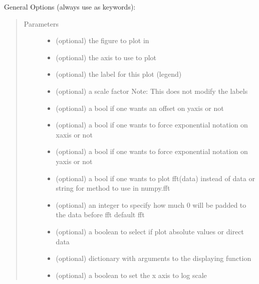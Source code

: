 \documentclass[letterpaper,10pt,openany,oneside,english]{sphinxmanual}
\begin{document}
\begin{fulllineitems}
\begin{fulllineitems}
General Options (always use as keywords):
\begin{quote}\begin{description}
\item[{Parameters}] \leavevmode\begin{itemize}
\item {} 
 \textendash{} (optional) the figure to plot in

\item {} 
 \textendash{} (optional) the axis to use to plot

\item {} 
 \textendash{} (optional) the label for this plot (legend)

\item {} 
 \textendash{} (optional) a scale factor Note: This does not modify the labels

\item {} 
 \textendash{} (optional) a bool if one wants an offset on yaxis or not

\item {} 
 \textendash{} (optional) a bool if one wants to force exponential notation on xaxis or not

\item {} 
 \textendash{} (optional) a bool if one wants to force exponential notation on yaxis or not

\item {} 
 \textendash{} (optional) a bool if one wants to plot fft(data) instead of data or string for method to use in numpy.fft

\item {} 
 \textendash{} (optional) an integer to specify how much 0 will be padded to the data before fft default fft

\item {} 
 \textendash{} (optional) a boolean to select if plot absolute values or direct data

\item {} 
 \textendash{} (optional) dictionary with arguments to the displaying function

\item {} 
 \textendash{} (optional) a boolean to set the x axis to log scale


\end{itemize}
\end{description}
\end{quote}
\end{fulllineitems}
\end{fulllineitems}
\end{document}
